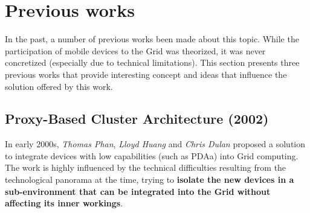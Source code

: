 \section{Previous works}
In the past, a number of previous works been made about this topic. While the participation of mobile devices to the Grid was theorized, it was never concretized (especially due to technical limitations). This section presents three previous works that provide interesting concept and ideas that influence the solution offered by this work.

\subsection{Proxy-Based Cluster Architecture (2002)}
In early 2000s, \textit{Thomas Phan}, \textit{Lloyd Huang} and \textit{Chris Dulan} proposed a solution to integrate devices with low capabilities (such as PDAa) into Grid computing. The work is highly influenced by the technical difficulties resulting from the technological panorama at the time, trying to \textbf{isolate the new devices in a sub-environment that can be integrated into the Grid without affecting its inner workings}.

